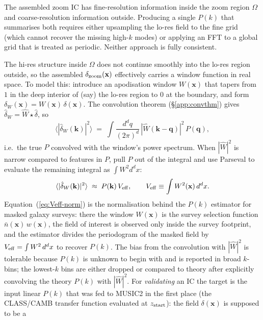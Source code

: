 \documentclass[12pt]{article}
\begin{document}
The assembled zoom IC has fine-resolution information inside the zoom
region $\Omega$ and coarse-resolution information outside. Producing a
single $P(k)$ that summarises both requires either upsampling the lo-res
field to the fine grid (which cannot recover the missing high-$k$ modes)
or applying an FFT to a global grid that is treated as periodic.
Neither approach is fully consistent.

The hi-res structure inside $\Omega$ does not continue smoothly into
the lo-res region outside, so the assembled $\delta_{\rm zoom}(\mathbf x)$
effectively carries a window function in real space. To model this:
introduce an apodisation window $W(\mathbf x)$ that tapers from $1$
in the deep interior of (say) the lo-res region to $0$ at the
boundary, and form $\delta_W(\mathbf x) = W(\mathbf x)\,\delta(\mathbf x)$.
The convolution theorem (\S\ref{app:convthm}) gives
$\hat\delta_W = \hat W \star \hat\delta$, so
\begin{equation}\label{eq:windowed-pk}
  \langle |\hat\delta_W(\mathbf k)|^2 \rangle
  \;=\; \int \frac{d^d q}{(2\pi)^d}\,
        |\hat W(\mathbf k-\mathbf q)|^2\, P(\mathbf q),
\end{equation}
i.e.\ the true $P$ convolved with the window's power spectrum. When
$|\hat W|^2$ is narrow compared to features in $P$, pull $P$ out of
the integral and use Parseval to evaluate the remaining integral as
$\int W^2 d^d x$:
\begin{equation}\label{eq:Veff-norm}
  \langle |\hat\delta_W(\mathbf k)|^2 \rangle
  \;\approx\; P(\mathbf k)\,V_{\rm eff},
  \qquad V_{\rm eff} \equiv \int W^2(\mathbf x)\,d^d x.
\end{equation}
Equation~(\ref{eq:Veff-norm}) is the normalisation behind the
\citet{FKP1994} $P(k)$ estimator for masked galaxy surveys: there the
window $W(\mathbf x)$ is the survey selection function
$\bar n(\mathbf x)\,w(\mathbf x)$, the field of interest is observed
only inside the survey footprint, and the estimator divides the
periodogram of the masked field by $V_{\rm eff}=\int W^2\,d^d x$ to
recover $P(k)$. The bias from the convolution with $|\hat W|^2$ is
tolerable because $P(k)$ is unknown to begin with and is reported in
broad $k$-bins; the lowest-$k$ bins are either dropped or compared to
theory after explicitly convolving the theory $P(k)$ with $|\hat W|^2$. For \emph{validating} an IC
the target is the input linear $P(k)$ that was fed to MUSIC2 in the
first place (the CLASS/CAMB transfer function evaluated at
$z_{\rm start}$): the field $\delta(\mathbf x)$ is supposed to be a
\end{document}

